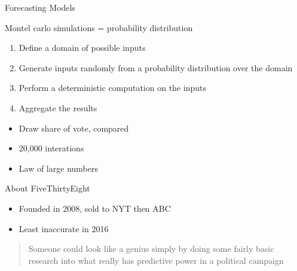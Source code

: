 \documentclass[ignorenonframetext,]{beamer}
\providecommand{\tightlist}{%
  \setlength{\itemsep}{0pt}\setlength{\parskip}{0pt}}
\begin{document}
\begin{frame}{Forecasting Models}

Montel carlo simulations = probability distribution

\begin{enumerate}
\def\labelenumi{\arabic{enumi}.}
\tightlist
\item
  Define a domain of possible inputs
\item
  Generate inputs randomly from a probability distribution over the
  domain
\item
  Perform a deterministic computation on the inputs
\item
  Aggregate the results
\end{enumerate}

\begin{itemize}
\tightlist
\item
  Draw share of vote, compared
\item
  20,000 interations
\item
  Law of large numbers
\end{itemize}

\end{frame}

\begin{frame}{About FiveThirtyEight}

\begin{itemize}
\tightlist
\item
  Founded in 2008, sold to NYT then ABC
\item
  Least inaccurate in 2016
\end{itemize}

\begin{quote}
Someone could look like a genius simply by doing some fairly basic
research into what really has predictive power in a political campaign
\end{quote}

\end{frame}
\end{document}
